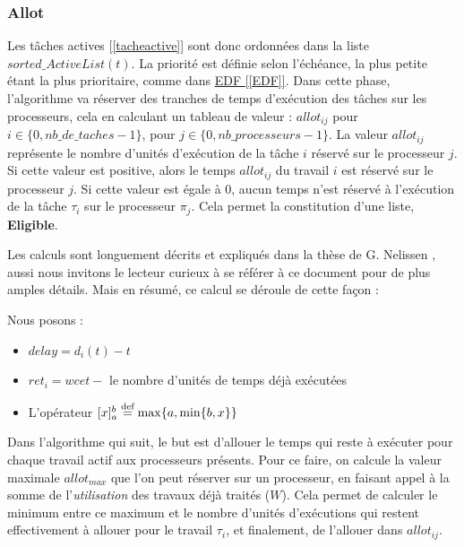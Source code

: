 	\subsubsection{Allot}\label{allot}
	Les tâches actives [\ref*{tacheactive}] sont donc ordonnées dans la liste $sorted\_ActiveList(t)$. 
	La priorité est définie selon l'échéance, la plus petite étant la plus prioritaire, comme dans \hyperref[EDF]{EDF [\ref*{EDF}]}.
	Dans cette phase, l'algorithme va \og{}réserver\fg{} des tranches de temps d'exécution des tâches sur les 
	processeurs, cela en calculant un tableau de valeur : \newline
	$allot_{ij}$ pour $i \in \{0, nb\_de\_taches - 1\}$, pour $j \in \{0, nb\_processeurs - 1\}$.
	La valeur $allot_{ij}$ représente le nombre d'unités d'exécution de la tâche $i$ réservé sur le processeur $j$.\newline
	Si cette valeur est positive, alors le temps $allot_{ij}$ du travail $i$ est réservé sur le 
	processeur $j$. Si cette valeur est égale à $0$, aucun temps n'est réservé 
	à l'exécution de la tâche $\tau_i$ sur le processeur $\pi_j$. Cela permet la constitution d'une liste, 
	\textbf{Eligible}.\newline


	Les calculs sont longuement décrits et expliqués dans la thèse de G. Nelissen \cite{nelissen_u-edf_2012}, aussi nous invitons 
	le lecteur curieux à se référer à ce document pour de plus amples détails. Mais en résumé, 
	ce calcul se déroule de cette façon :
	
	Nous posons :
	\begin{itemize}
		\setlength\itemsep{0.1em}
		\item $delay = d_i(t) - t$
		\item $ret_i = wcet - $ le nombre d'unités de temps déjà exécutées
		\item L'opérateur $[x]_a^b \stackrel{\text{def}}{=} \max\{a, \min\{b, x \}\}$
	\end{itemize}

	Dans l'algorithme qui suit, le but est d'\og{}allouer\fg{} le temps qui reste à exécuter pour chaque travail 
	actif aux processeurs présents.
	Pour ce faire, on calcule la valeur maximale $allot_{max}$ que l'on peut réserver sur un processeur, 
	en faisant appel à la somme de l'\textit{utilisation} des travaux déjà traités ($W$).
	Cela permet de calculer le minimum entre ce maximum et le nombre d'unités d'exécutions qui 
	restent effectivement à allouer pour le travail $\tau_i$, et finalement, de l'allouer dans 
	$allot_{ij}$.

